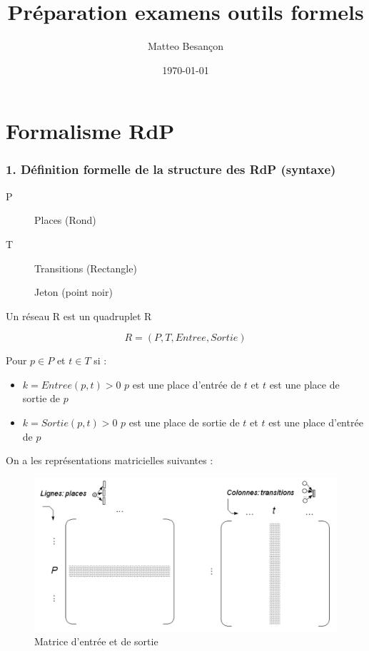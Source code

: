 \documentclass[12pt,a4paper,oneside]{article}
\author{Matteo Besançon}
\title {Préparation examens outils formels}
\date{\today}
\begin{document}
	\maketitle

\section{Formalisme RdP}
	\subsubsection*{1. Définition formelle de la structure des RdP (syntaxe)}
		\begin{description}
			\item [P] Places (Rond)
			\item [T] Transitions (Rectangle)
			\item [ ] Jeton (point noir)
		\end{description}

		Un réseau R est un quadruplet R

		$$R = (P,T, Entree, Sortie)$$

		Pour $p \in P$ et $t \in T$ si :
		\begin{itemize}
			\item $k = Entree(p,t) > 0$ $p$ est une place d'entrée de $t$ et $t$ est une place de sortie de $p$
			\item $k = Sortie(p,t) > 0$ $p$ est une place de sortie de $t$ et $t$ est une place d'entrée de $p$
		\end{itemize}

		On a les représentations matricielles suivantes :

		\begin{figure}[H]
			\includegraphics[scale = 0.4]{./img/entree.png}
			\centering
			\caption{Matrice d'entrée et de sortie}
			\label{entreeSortie}
		\end{figure}
\end{document}
